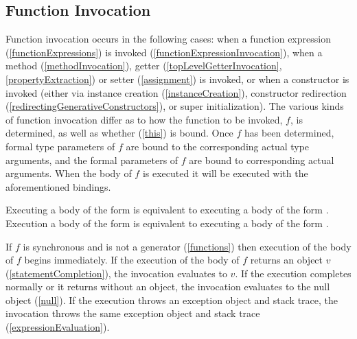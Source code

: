 \documentclass[makeidx]{article}
\begin{document}
{


\subsection{Function Invocation}

\LMHash{}%
Function invocation occurs in the following cases:
when a function expression (\ref{functionExpressions})
is invoked (\ref{functionExpressionInvocation}),
when a method (\ref{methodInvocation}),
getter (\ref{topLevelGetterInvocation}, \ref{propertyExtraction})
or setter (\ref{assignment})
is invoked,
or when a constructor is invoked
(either via instance creation (\ref{instanceCreation}),
constructor redirection (\ref{redirectingGenerativeConstructors}),
or super initialization).
The various kinds of function invocation differ as to
how the function to be invoked, $f$, is determined,
as well as whether \THIS{} (\ref{this}) is bound.
Once $f$ has been determined,
formal type parameters of $f$ are bound to
the corresponding actual type arguments,
and the formal parameters of $f$ are bound to corresponding actual arguments.
When the body of $f$ is executed it will be executed
with the aforementioned bindings.

\LMHash{}%
Executing a body of the form  is equivalent to executing
a body of the form .
Execution a body of the form  is equivalent to executing
a body of the form .

\LMHash{}%
If $f$ is synchronous and is not a generator (\ref{functions}) then
execution of the body of $f$ begins immediately.
If the execution of the body of $f$ returns an object $v$
(\ref{statementCompletion}),
the invocation evaluates to $v$.
If the execution completes normally or it returns without an object,
the invocation evaluates to the null object (\ref{null}).
If the execution throws an exception object and stack trace,
the invocation throws the same exception object and stack trace
(\ref{expressionEvaluation}).


}
\end{document}
